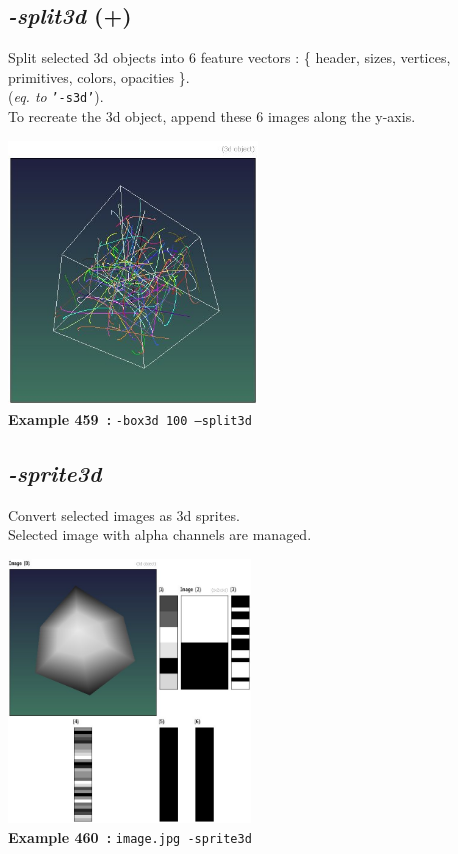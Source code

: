 \documentclass[a4paper,11pt,twoside]{book}
\begin{document}
\subsection{\emph{-split3d} (+)}\vspace*{-0.5em}
Split selected 3d objects into 6 feature vectors :
\{ header, sizes, vertices, primitives, colors, opacities \}.
~\\(\emph{eq. to} {\small \texttt{'-s3d'}}).
~\\To recreate the 3d object, append these 6 images along the y-axis.
\begin{center}\includegraphics[keepaspectratio=true,height=7cm,width=\textwidth]{img/gmic_def459.jpg}\\
{\footnotesize \textbf{Example 459~:} \texttt{-box3d 100 --split3d}}
\end{center}

\subsection{\emph{-sprite3d} }\vspace*{-0.5em}
Convert selected images as 3d sprites.
~\\Selected image with alpha channels are managed.
\begin{center}\includegraphics[keepaspectratio=true,height=7cm,width=\textwidth]{img/gmic_def460.jpg}\\
{\footnotesize \textbf{Example 460~:} \texttt{image.jpg -sprite3d}}
\end{center}
\end{document}
